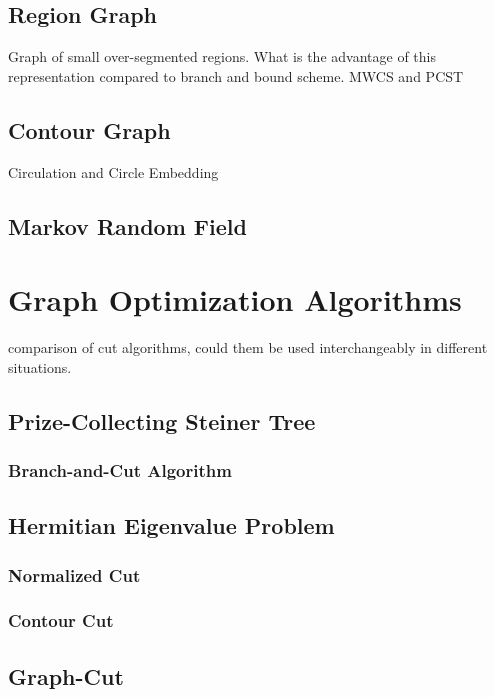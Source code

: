 \documentclass{SMBV12}
\begin{document}
\subsection{Region Graph}

Graph of small over-segmented regions. What is the advantage of this representation compared to branch and bound scheme. MWCS and PCST

\subsection{Contour Graph}

Circulation and Circle Embedding

\subsection{Markov Random Field}

\section{Graph Optimization Algorithms}

comparison of cut algorithms, could them be used interchangeably in different situations.

\subsection{Prize-Collecting Steiner Tree}

\subsubsection{Branch-and-Cut Algorithm}

\subsection{Hermitian Eigenvalue Problem}

\subsubsection{Normalized Cut}

\subsubsection{Contour Cut}

\subsection{Graph-Cut}
\end{document}
